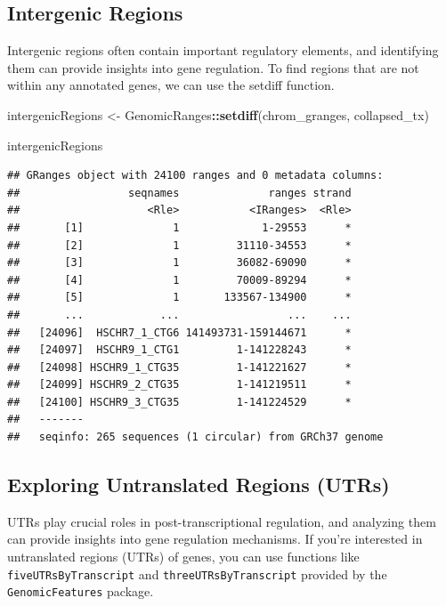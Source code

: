 \documentclass[
]{book}
\newenvironment{Shaded}{\begin{snugshade}}{\end{snugshade}}
\newcommand{\FunctionTok}[1]{\textcolor[rgb]{0.13,0.29,0.53}{\textbf{#1}}}
\newcommand{\NormalTok}[1]{#1}
\newcommand{\OtherTok}[1]{\textcolor[rgb]{0.56,0.35,0.01}{#1}}
\newcommand{\SpecialCharTok}[1]{\textcolor[rgb]{0.81,0.36,0.00}{\textbf{#1}}}
\begin{document}
\hypertarget{intergenic-regions}{%
\subsection{Intergenic Regions}\label{intergenic-regions}}

Intergenic regions often contain important regulatory elements, and identifying them can provide insights into gene regulation. To find regions that are not within any annotated genes, we can use the setdiff function.

\begin{Shaded}
\begin{Highlighting}[]
\NormalTok{intergenicRegions }\OtherTok{\textless{}{-}}\NormalTok{ GenomicRanges}\SpecialCharTok{::}\FunctionTok{setdiff}\NormalTok{(chrom\_granges, collapsed\_tx)}

\NormalTok{intergenicRegions }
\end{Highlighting}
\end{Shaded}

\begin{verbatim}
## GRanges object with 24100 ranges and 0 metadata columns:
##                 seqnames              ranges strand
##                    <Rle>           <IRanges>  <Rle>
##       [1]              1             1-29553      *
##       [2]              1         31110-34553      *
##       [3]              1         36082-69090      *
##       [4]              1         70009-89294      *
##       [5]              1       133567-134900      *
##       ...            ...                 ...    ...
##   [24096]  HSCHR7_1_CTG6 141493731-159144671      *
##   [24097]  HSCHR9_1_CTG1         1-141228243      *
##   [24098] HSCHR9_1_CTG35         1-141221627      *
##   [24099] HSCHR9_2_CTG35         1-141219511      *
##   [24100] HSCHR9_3_CTG35         1-141224529      *
##   -------
##   seqinfo: 265 sequences (1 circular) from GRCh37 genome
\end{verbatim}

\hypertarget{exploring-untranslated-regions-utrs}{%
\subsection{Exploring Untranslated Regions (UTRs)}\label{exploring-untranslated-regions-utrs}}

UTRs play crucial roles in post-transcriptional regulation, and analyzing them can provide insights into gene regulation mechanisms. If you're interested in untranslated regions (UTRs) of genes, you can use functions like \texttt{fiveUTRsByTranscript} and \texttt{threeUTRsByTranscript} provided by the \texttt{GenomicFeatures} package.
\end{document}
